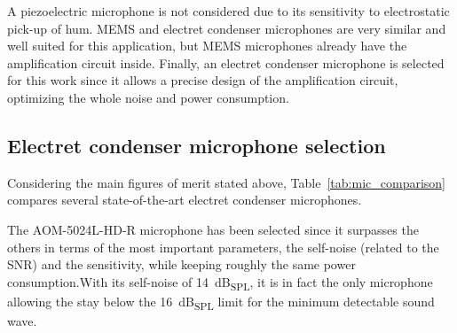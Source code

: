 \documentclass{EPL-master-thesis-covers-EN}
\begin{document}
A piezoelectric microphone is not considered due to its sensitivity to electrostatic pick-up of hum. MEMS and electret condenser microphones are very similar and well suited for this application, but MEMS microphones already have the amplification circuit inside.
Finally, an electret condenser microphone is selected for this work since it allows a precise design of the amplification circuit, optimizing the whole noise and power consumption.

\subsection*{Electret condenser microphone selection}

Considering the main figures of merit stated above, Table~\ref{tab:mic_comparison} compares several state-of-the-art electret condenser microphones.

\begin{table}[H]
\centering
{}
\caption{Comparison of several electret condenser microphones}
\label{tab:mic_comparison}
\end{table}

The AOM-5024L-HD-R microphone has been selected since it surpasses the others in terms of the most important parameters, the self-noise (related to the SNR) and the sensitivity, while keeping roughly the same power consumption.With its self-noise of \SI{14}{dB_{SPL}}, it is in fact the only microphone allowing the stay below the \SI{16}{dB_{SPL}} limit for the minimum detectable sound wave.
\end{document}
